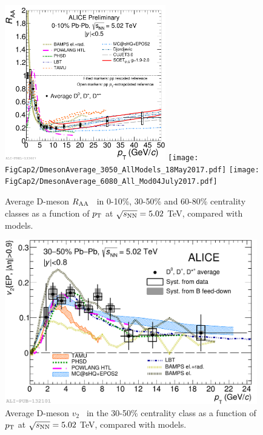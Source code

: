 \begin{figure}[!ht]
  \centering
    \includegraphics[width=7cm]{FigCap2/2017-Jul-07-DmesonAverage_010_All_Models_04July2017.pdf}
    \texttt{[image: FigCap2/DmesonAverage\_3050\_AllModels\_18May2017.pdf]}
    \texttt{[image: FigCap2/DmesonAverage\_6080\_All\_Mod04July2017.pdf]}
  \caption{Average D-meson $R_{\rm AA}$~\cite{ALICE-PUBLIC-2017-003} in 0-10\%, 30-50\% and 60-80\% centrality classes as a function of $p_{\rm T}$ at $\sqrt{s_{\rm NN}} = 5.02$ TeV, compared with models.}
  \label{fig:RAADs}
\end{figure}



\begin{figure}[!ht]
  \centering
    \includegraphics[width=11cm]{FigCap2/2017-Jul-04-DmesonComparisonWithModels.pdf}
  \caption{Average D-meson $v_2$~\cite{Acharya:2017qps} in the 30-50\% centrality class as a function of $p_{\rm T}$ at $\sqrt{s_{\rm NN}} = 5.02$ TeV, compared with models.}
  \label{fig:Dmesonsv2}
\end{figure}

